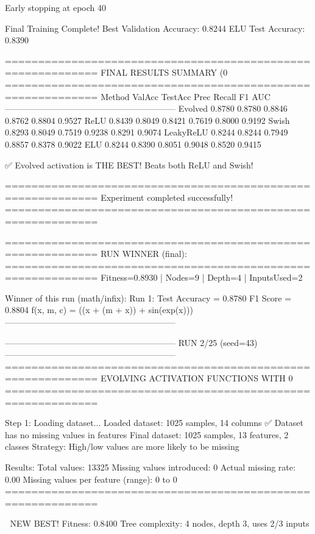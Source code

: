 Early stopping at epoch 40

Final Training Complete!
Best Validation Accuracy: 0.8244
ELU Test Accuracy: 0.8390

============================================================
FINAL RESULTS SUMMARY (0%
============================================================
Method             ValAcc     TestAcc    Prec       Recall     F1         AUC
------------------------------------------------------------
Evolved            0.8780     0.8780     0.8846     0.8762     0.8804     0.9527
ReLU               0.8439     0.8049     0.8421     0.7619     0.8000     0.9192
Swish              0.8293     0.8049     0.7519     0.9238     0.8291     0.9074
LeakyReLU          0.8244     0.8244     0.7949     0.8857     0.8378     0.9022
ELU                0.8244     0.8390     0.8051     0.9048     0.8520     0.9415

✅ Evolved activation is THE BEST! Beats both ReLU and Swish!

============================================================
Experiment completed successfully!
============================================================

============================================================
RUN WINNER (final):
============================================================
Fitness=0.8930 | Nodes=9 | Depth=4 | InputsUsed=2

Winner of this run (math/infix):
  Run 1:
     Test Accuracy = 0.8780
     F1 Score      = 0.8804
     f(x, m, c)    = ((x + (m + x)) + sin(exp(x)))
------------------------------------------------------------

------------------------------------------------------------
RUN 2/25 (seed=43)
------------------------------------------------------------
============================================================
EVOLVING ACTIVATION FUNCTIONS
WITH 0%
============================================================

Step 1: Loading dataset...
Loaded dataset: 1025 samples, 14 columns
✅ Dataset has no missing values in features
Final dataset: 1025 samples, 13 features, 2 classes
Strategy: High/low values are more likely to be missing

Results:
  Total values: 13325
  Missing values introduced: 0
  Actual missing rate: 0.00%
  Missing values per feature (range): 0 to 0
============================================================


🎯 NEW BEST! Fitness: 0.8400
Tree complexity: 4 nodes, depth 3, uses 2/3 inputs

